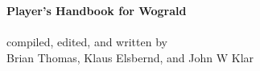 \thispagestyle{empty}
\dblesp

%
\noindent
\begin{center}
%
{\large \bf Player's Handbook for Wograld}\\[0.5 cm]
 \\[1.0 cm]
%
compiled, edited, and written by\\[0.5 cm]
Brian Thomas, Klaus Elsbernd, and John W Klar \\
%
\end{center}
